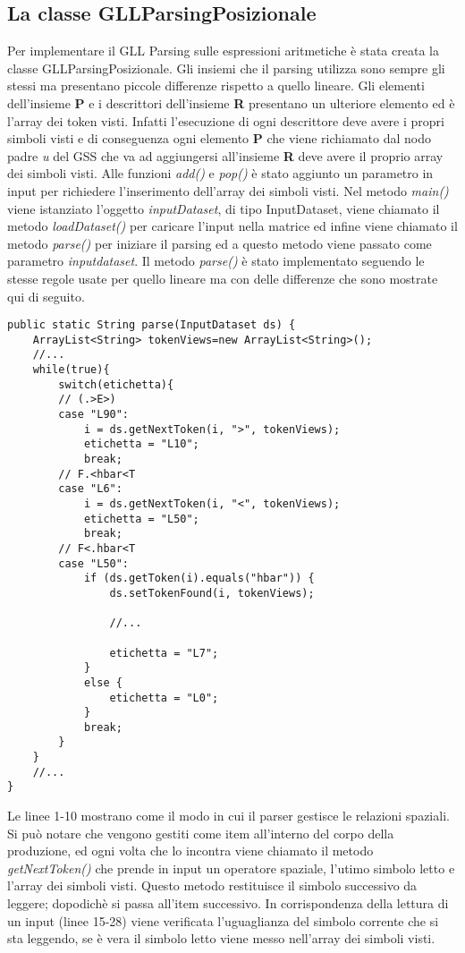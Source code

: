 \subsection{La classe GLLParsingPosizionale}
Per implementare il GLL Parsing sulle espressioni aritmetiche è stata creata la classe GLLParsingPosizionale. Gli insiemi che il parsing utilizza sono sempre gli stessi ma presentano piccole differenze rispetto a quello lineare. Gli elementi dell'insieme \textbf{P} e i descrittori dell'insieme \textbf{R} presentano un ulteriore elemento ed è l'array dei token visti. Infatti l'esecuzione di ogni descrittore deve avere i propri simboli visti e di conseguenza ogni elemento \textbf{P} che viene richiamato dal nodo padre \textit{u} del GSS che va ad aggiungersi all'insieme \textbf{R} deve avere il proprio array dei simboli visti.  Alle funzioni \textit{add()} e \textit{pop()} è stato aggiunto un parametro in input per richiedere l'inserimento dell'array dei simboli visti. Nel metodo \textit{main()} viene istanziato l'oggetto \textit{inputDataset}, di tipo InputDataset, viene chiamato il metodo \textit{loadDataset()} per caricare l'input nella matrice ed infine viene chiamato il metodo \textit{parse()} per iniziare il parsing ed a questo metodo viene passato come parametro \textit{inputdataset}. Il metodo \textit{parse()} è stato implementato seguendo le stesse regole usate per quello lineare ma con delle differenze che sono mostrate qui di seguito.
\begin{lstlisting}
public static String parse(InputDataset ds) {
	ArrayList<String> tokenViews=new ArrayList<String>();
	//...
	while(true){
		switch(etichetta){
		// (.>E>)
		case "L90":
			i = ds.getNextToken(i, ">", tokenViews);
			etichetta = "L10";
			break;
		// F.<hbar<T
		case "L6":
			i = ds.getNextToken(i, "<", tokenViews);
			etichetta = "L50";
			break;
		// F<.hbar<T
		case "L50":
			if (ds.getToken(i).equals("hbar")) {
				ds.setTokenFound(i, tokenViews);
			
				//...
			
				etichetta = "L7";
			} 
			else {
				etichetta = "L0";
			}
			break;
		}
	}
	//...
}
\end{lstlisting}
Le linee 1-10 mostrano come il modo in cui il parser gestisce le relazioni spaziali. Si può notare che vengono gestiti come item all'interno del corpo della produzione, ed ogni volta che lo incontra viene chiamato il metodo \textit{getNextToken()} che prende in input un operatore spaziale, l'utimo simbolo letto e l'array dei simboli visti. Questo metodo restituisce il simbolo successivo da leggere; dopodichè si passa all'item successivo. In corrispondenza della lettura di un input (linee 15-28) viene verificata l'uguaglianza del simbolo corrente che si sta leggendo, se è vera il simbolo letto viene messo nell'array dei simboli visti.
